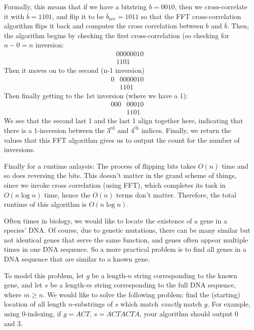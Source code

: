 \documentclass[11pt]{article}
\begin{document}
\begin{solution}
	Formally, this means that if we have a bitstring $b = 0010$, then we cross-correlate it with $\overline b =
	1101$, and flip it to be $\overline b_{\text{rev}}= 1011$ so that the FFT cross-correlation algorithm 
	flips it back and computes the cross correlation between $b$ and $\overline b$. Then, the algorithm 
	begins by checking the first cross-correlation (so checking for $n-0 = n$ inversion: 
	\begin{align*}
		&00000010\\
		&1101
	\end{align*}
	Then it moves on to the second (n-1 inversion)
	\begin{align*}
		0&0000010\\
		 &1101
	\end{align*}
	Then finally getting to the 1st inversion (where we have a 1):
	\begin{align*}
		000&00010\\
		   &1101
	\end{align*}
	We see that the second last 1 and the last 1 align together here, indicating that there is a $1$-inversion 
	between the $\mathrm{3^{rd}}$ and $\mathrm{4^{th}}$ indices. Finally, we return the values that this FFT
	algorithm gives us to output the count for the number of inversions.
	
	Finally for a runtime anlaysis: The process of flipping bits takes $O(n)$ time and so does reversing 
	the bits. This doesn't matter in the grand scheme of things, since we invoke cross correlation (using FFT), 
	which completes its task in $O(n \log n)$ time, hence the $O(n)$ terms don't matter. Therefore, 
	the total runtime of this algorithm is $O(n \log n)$. 
\end{solution}
\pagebreak
{}
Often times in biology, we would like to locate the existence of a gene in a species' DNA. Of course, due to genetic mutations, 
there can be many similar but not identical genes that serve the same function, and genes often appear multiple times in one DNA sequence. 
So a more practical problem is to find all genes in a DNA sequence that are similar to a known gene.

To model this problem, let $g$ be a length-$n$ string corresponding to the known gene, and let $s$ be 
a length-$m$ string corresponding to the full DNA sequence, where $m \geq n$. We would like to solve the following problem:
find the (starting) location of all length $n$-substrings of $s$ which match \emph{exactly} match $g$.
For example, using $0$-indexing, if $g = ACT$, $s = ACTACTA$, your algorithm should output $0$ and $3$.
\end{document}
